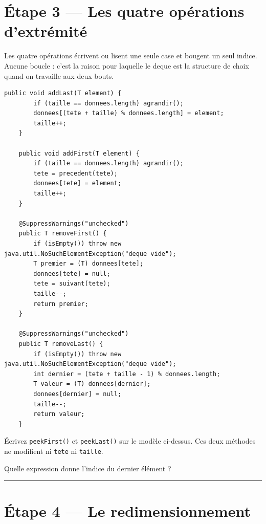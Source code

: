 \documentclass[11pt,a4paper]{article}
\newcommand{\lig}[1]{\rule{#1}{0.4pt}}
\begin{document}
\section{Étape 3 --- Les quatre opérations d'extrémité}

\begin{lienbox}[Ce qu'on matérialise du CM]
Les quatre opérations écrivent ou lisent une seule case et bougent un seul
indice. Aucune boucle : c'est la raison pour laquelle le deque est la
structure de choix quand on travaille aux deux bouts.
\end{lienbox}

\begin{lstlisting}[caption={Les quatre opérations}]
    public void addLast(T element) {
        if (taille == donnees.length) agrandir();
        donnees[(tete + taille) % donnees.length] = element;
        taille++;
    }

    public void addFirst(T element) {
        if (taille == donnees.length) agrandir();
        tete = precedent(tete);
        donnees[tete] = element;
        taille++;
    }

    @SuppressWarnings("unchecked")
    public T removeFirst() {
        if (isEmpty()) throw new java.util.NoSuchElementException("deque vide");
        T premier = (T) donnees[tete];
        donnees[tete] = null;
        tete = suivant(tete);
        taille--;
        return premier;
    }

    @SuppressWarnings("unchecked")
    public T removeLast() {
        if (isEmpty()) throw new java.util.NoSuchElementException("deque vide");
        int dernier = (tete + taille - 1) % donnees.length;
        T valeur = (T) donnees[dernier];
        donnees[dernier] = null;
        taille--;
        return valeur;
    }
\end{lstlisting}

\begin{exercicebox}
Écrivez \texttt{peekFirst()} et \texttt{peekLast()} sur le modèle
ci-dessus. Ces deux méthodes ne modifient ni \texttt{tete} ni
\texttt{taille}.

Quelle expression donne l'indice du dernier élément ? \lig{7cm}
\end{exercicebox}

\section{Étape 4 --- Le redimensionnement}
\end{document}
